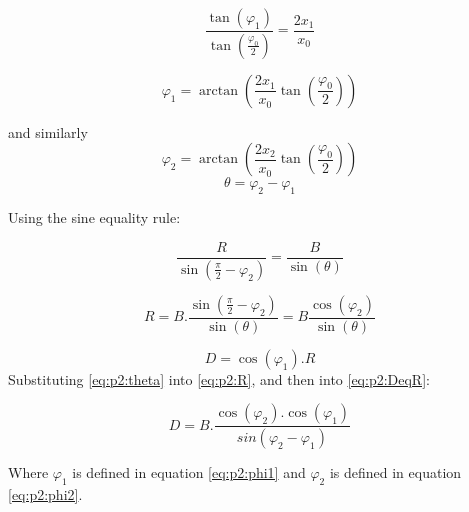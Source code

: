 \begin{equation} \label{eq:p2:tanphi0and1}
\frac{\tan(\varphi_{1})}{\tan(\frac{\varphi_0}{2})} = \frac{2x_1}{x_0}
\end{equation}

\begin{equation} \label{eq:p2:phi1:ap}
\varphi_1 = \arctan\left(\frac{2x_1}{x_0}\tan\left(\frac{\varphi_0}{2}\right)\right)
\end{equation}

and similarly
\begin{equation} \label{eq:p2:phi2:ap}
\varphi_2 = \arctan\left(\frac{2x_2}{x_0}\tan\left(\frac{\varphi_0}{2}\right)\right)
\end{equation}
\begin{equation} \label{eq:p2:theta}
\theta = \varphi_2 - \varphi_1
\end{equation}

Using the sine equality rule:

\begin{equation} \label{eq:p2:sineeq}
\frac{R}{\sin(\frac{\pi}{2} - \varphi_2)} = \frac{B}{\sin(\theta)}
\end{equation}

\begin{equation} \label{eq:p2:R}
R = B.\frac{\sin(\frac{\pi}{2} - \varphi_2)}{\sin(\theta)} = B \frac{\cos(\varphi_2)}{\sin(\theta)}
\end{equation}

\begin{equation} \label{eq:p2:DeqR}
D = \cos(\varphi_1).R
\end{equation}
Substituting \eqref{eq:p2:theta} into \eqref{eq:p2:R}, and then into \eqref{eq:p2:DeqR}:

\begin{equation} \label{eq:p2:DeqB}
D = B.\frac{\cos(\varphi_2).\cos(\varphi_1)}{sin(\varphi_2 - \varphi_1)}
\end{equation}

Where $\varphi_1$ is defined in equation \eqref{eq:p2:phi1} and $\varphi_2$ is defined in equation \eqref{eq:p2:phi2}. 

